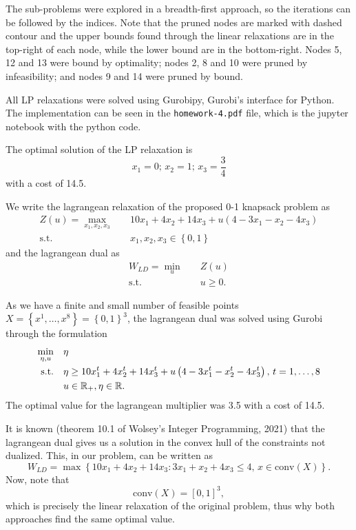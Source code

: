 \documentclass[a4paper]{report}
\begin{document}
The sub-problems were explored in a breadth-first approach, so the iterations can be followed by the indices. Note that the pruned nodes are marked with dashed contour and the upper bounds found through the linear relaxations are in the top-right of each node, while the lower bound are in the bottom-right. Nodes 5, 12 and 13 were bound by optimality; nodes 2, 8 and 10 were pruned by infeasibility; and nodes 9 and 14 were pruned by bound.

All LP relaxations were solved using Gurobipy, Gurobi's interface for Python. The implementation can be seen in the \texttt{homework-4.pdf} file, which is the jupyter notebook with the python code.


The optimal solution of the LP relaxation is \[
x_1 = 0;\, x_2=1;\, x_3=\frac{3}{4}
\] with a cost of 14.5.

We write the lagrangean relaxation of the proposed 0-1 knapsack problem as
\begin{align*}
    Z(u) = \max_{x_1,x_2,x_3} \quad & 10x_1+4x_2+14x_3 + u\left( 4-3x_1-x_2-4x_3 \right)  \\
    \textrm{s.t.} \quad & x_1,x_2,x_3\in \left\{ 0,1 \right\}
\end{align*}
and the lagrangean dual as
\begin{align*}
    W_{LD} = \min_{u} \quad & Z(u) \\
    \textrm{s.t.} \quad & u\ge 0
.\end{align*}

As we have a finite and small number of feasible points $X=\left\{ x^{1},\ldots,x^{8} \right\} = \left\{ 0,1 \right\}^{3}$, the lagrangean dual was solved using Gurobi through the formulation
\begin{align*}
    \min_{\eta,u} \quad & \eta \\
    \textrm{s.t.} \quad & \eta \ge 10x_1^{t}+4x_2^{t}+14x_3^{t} + u\left( 4-3x_1^{t}-x_2^{t}-4x_3^{t} \right),\, t=1,\ldots,8  \\
      & u\in \mathbb{R}_+,\eta\in \mathbb{R}
.\end{align*}
The optimal value for the lagrangean multiplier was 3.5 with a cost of 14.5.

It is known (theorem 10.1 of Wolsey's Integer Programming, 2021) that the lagrangean dual gives us a solution in the convex hull of the constraints not dualized. This, in our problem, can be written as \[
W_{LD} = \max\left\{ 10x_1+4x_2+14x_3 : 3x_1+x_2+4x_3\le 4,\, x\in \text{conv}\left( X \right)  \right\} 
.\] Now, note that \[
\text{conv}\left( X \right) = \left[ 0,1 \right] ^{3}
,\] which is precisely the linear relaxation of the original problem, thus why both approaches find the same optimal value.
\end{document}
